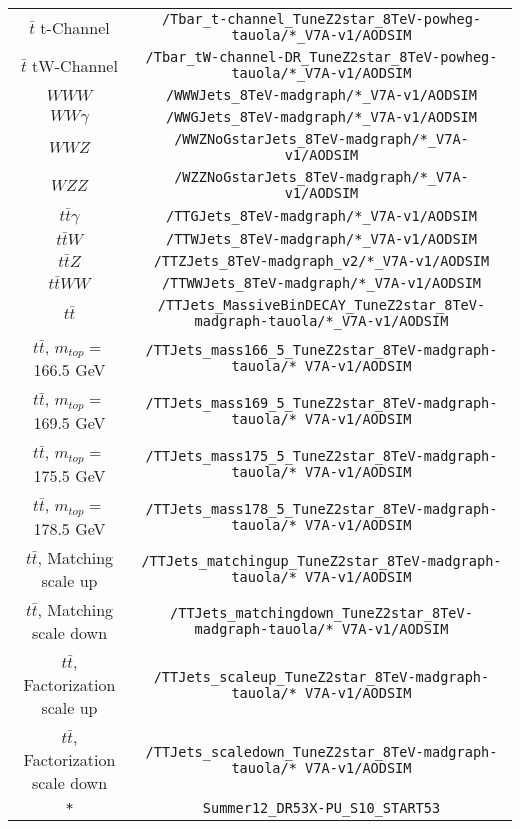 \begin{table}[htb]
\begin{tabular}{c|c}
$\bar{t}$ t-Channel & \verb+/Tbar_t-channel_TuneZ2star_8TeV-powheg-tauola/*_V7A-v1/AODSIM+ \\
$\bar{t}$ tW-Channel & \verb+/Tbar_tW-channel-DR_TuneZ2star_8TeV-powheg-tauola/*_V7A-v1/AODSIM+ \\
\hline 
$WWW$ & \verb+/WWWJets_8TeV-madgraph/*_V7A-v1/AODSIM+ \\
$WW\gamma$ & \verb+/WWGJets_8TeV-madgraph/*_V7A-v1/AODSIM+ \\
$WWZ$ & \verb+/WWZNoGstarJets_8TeV-madgraph/*_V7A-v1/AODSIM+ \\
$WZZ$ & \verb+/WZZNoGstarJets_8TeV-madgraph/*_V7A-v1/AODSIM+ \\
$t\bar{t}\gamma$ & \verb+/TTGJets_8TeV-madgraph/*_V7A-v1/AODSIM+ \\
$t\bar{t}W$ & \verb+/TTWJets_8TeV-madgraph/*_V7A-v1/AODSIM+ \\
$t\bar{t}Z$ & \verb+/TTZJets_8TeV-madgraph_v2/*_V7A-v1/AODSIM+ \\
$t\bar{t}WW$ & \verb+/TTWWJets_8TeV-madgraph/*_V7A-v1/AODSIM+ \\
\hline 
$t\bar{t}$ & \verb+/TTJets_MassiveBinDECAY_TuneZ2star_8TeV-madgraph-tauola/*_V7A-v1/AODSIM+ \\
$t\bar{t}$, $m_{top} =$ 166.5 GeV & \verb+/TTJets_mass166_5_TuneZ2star_8TeV-madgraph-tauola/* V7A-v1/AODSIM+ \\
$t\bar{t}$, $m_{top} =$ 169.5 GeV & \verb+/TTJets_mass169_5_TuneZ2star_8TeV-madgraph-tauola/* V7A-v1/AODSIM+ \\
$t\bar{t}$, $m_{top} =$ 175.5 GeV & \verb+/TTJets_mass175_5_TuneZ2star_8TeV-madgraph-tauola/* V7A-v1/AODSIM+ \\
$t\bar{t}$, $m_{top} =$ 178.5 GeV & \verb+/TTJets_mass178_5_TuneZ2star_8TeV-madgraph-tauola/* V7A-v1/AODSIM+ \\
$t\bar{t}$, Matching scale up & \verb+/TTJets_matchingup_TuneZ2star_8TeV-madgraph-tauola/* V7A-v1/AODSIM+ \\
$t\bar{t}$, Matching scale down & \verb+/TTJets_matchingdown_TuneZ2star_8TeV-madgraph-tauola/* V7A-v1/AODSIM+ \\
$t\bar{t}$, Factorization scale up & \verb+/TTJets_scaleup_TuneZ2star_8TeV-madgraph-tauola/* V7A-v1/AODSIM+ \\
$t\bar{t}$, Factorization scale down & \verb+/TTJets_scaledown_TuneZ2star_8TeV-madgraph-tauola/* V7A-v1/AODSIM+ \\
\hline
\verb+*+ & \verb+Summer12_DR53X-PU_S10_START53+ \\
\end{tabular}





\end{table} 




